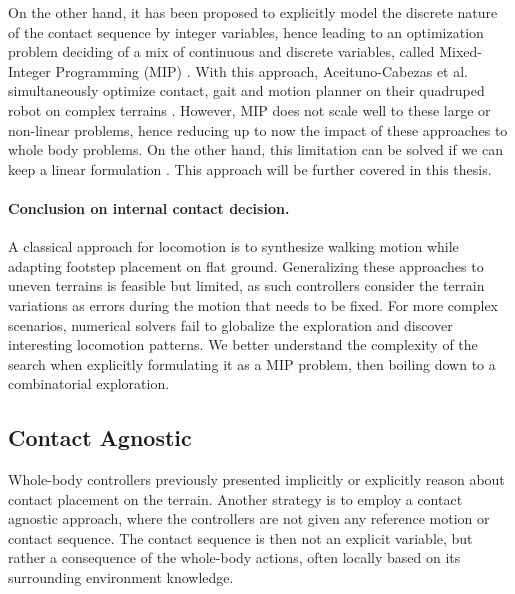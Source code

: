 On the other hand, it has been proposed to explicitly model the discrete nature of the contact sequence by integer variables, hence leading to an optimization problem deciding of a mix of continuous and discrete variables, called Mixed-Integer Programming (MIP) \cite{gurobi_mip}.
With this approach, Aceituno-Cabezas et al. simultaneously optimize contact, gait and motion planner on their quadruped robot on complex terrains \cite{carlos_2019}.
However, MIP does not scale well to these large or non-linear problems, hence reducing up to now the impact of these approaches to whole body problems.
On the other hand, this limitation can be solved if we can keep a linear formulation \cite{sl1m_v1}. This approach will be further covered in this thesis.


\paragraph{Conclusion on internal contact decision.}
A classical approach for locomotion is to synthesize walking motion while adapting footstep placement on flat ground.
Generalizing these approaches to uneven terrains is feasible but limited, as such controllers consider the terrain variations as errors during the motion that needs to be fixed.
For more complex scenarios, numerical solvers fail to globalize the exploration and discover interesting locomotion patterns.
We better understand the complexity of the search when explicitly formulating it as a MIP problem, then boiling down to a combinatorial exploration.

\subsection{Contact Agnostic}
Whole-body controllers previously presented implicitly or explicitly reason about contact placement on the terrain.
Another strategy is to employ a contact agnostic approach, where the controllers are not given any reference motion or contact sequence.
The contact sequence is then not an explicit variable, but rather a consequence of the whole-body actions, often locally based on its surrounding environment knowledge.

